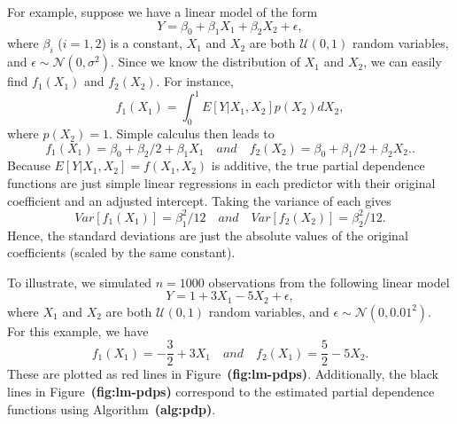 \documentclass[12pt]{article}
\def\ref#1{\textbf{(#1)}}
\begin{document}
For example, suppose we have a linear model of the form
\begin{equation*}
  Y = \beta_0 + \beta_1 X_1 + \beta_2 X_2 + \epsilon,
\end{equation*}
where $\beta_i$ ($i = 1, 2$) is a constant, $X_1$ and $X_2$ are both $\mathcal{U}\left(0, 1\right)$ random variables, and $\epsilon \sim \mathcal{N}\left(0, \sigma ^ 2\right)$. Since we know the distribution of $X_1$ and $X_2$, we can easily find $f_1\left(X_1\right)$ and $f_2\left(X_2\right)$. For instance, 
\begin{equation*}
  f_1\left(X_1\right) = \int_0^1 E\left[Y | X_1, X_2\right] p\left(X_2\right) dX_2,
\end{equation*}
where $p\left(X_2\right) = 1$. Simple calculus then leads to 
\begin{equation*}
  f_1\left(X_1\right) = \beta_0 + \beta_2 / 2 + \beta_1 X_1 \quad and \quad f_2\left(X_2\right) = \beta_0 + \beta_1 / 2 + \beta_2 X_2..
\end{equation*}
Because $E\left[Y | X_1, X_2\right] = f\left(X_1, X_2\right)$ is additive, the true partial dependence functions are just simple linear regressions in each predictor with their original coefficient and an adjusted intercept. Taking the variance of each gives
\begin{equation*}
Var\left[f_1\left(X_1\right)\right] = \beta_1 ^ 2 / 12 \quad and \quad Var\left[f_2\left(X_2\right)\right] = \beta_2 ^ 2 / 12.
\end{equation*}
Hence, the standard deviations are just the absolute values of the original coefficients (scaled by the same constant).

To illustrate, we simulated $n = 1000$ observations from the following linear model
\begin{equation*}
  Y = 1 + 3 X_1 - 5 X_2 + \epsilon,
\end{equation*}
where $X_1$ and $X_2$ are both $\mathcal{U}\left(0, 1\right)$ random variables, and $\epsilon \sim \mathcal{N}\left(0, 0.01 ^ 2\right)$. For this example, we have 
\begin{equation*}
  f_1\left(X_1\right) = -\frac{3}{2} + 3 X_1 \quad and \quad f_2\left(X_1\right) = \frac{5}{2} - 5 X_2.
\end{equation*}
These are plotted as red lines in Figure~\ref{fig:lm-pdps}. Additionally, the black lines in Figure~\ref{fig:lm-pdps} correspond to the estimated partial dependence functions using Algorithm~\ref{alg:pdp}.
\end{document}
